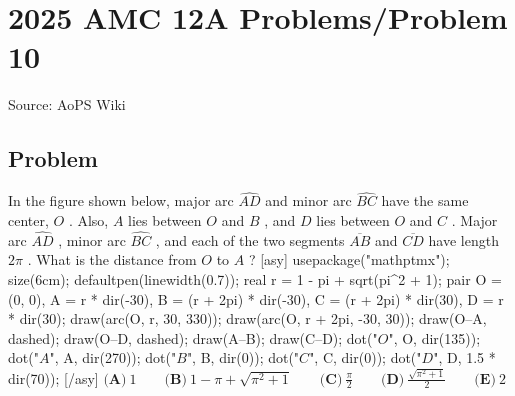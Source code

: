 \documentclass[12pt]{article}
\begin{document}
\section*{{2025 AMC 12A Problems/Problem 10}}
Source: AoPS Wiki

\subsection*{Problem}
In the figure shown below, major arc $\widehat{AD}$ and minor arc $\widehat{BC}$ have the same center, $O$ . Also, $A$ lies between $O$ and $B$ , and $D$ lies between $O$ and $C$ . Major arc $\widehat{AD}$ , minor arc $\widehat{BC}$ , and each of the two segments $\overline{AB}$ and $\overline{CD}$ have length $2\pi$ . What is the distance from $O$ to $A$ ? [asy] usepackage("mathptmx"); size(6cm); defaultpen(linewidth(0.7)); real r = 1 - pi + sqrt(pi^2 + 1); pair O = (0, 0), A = r * dir(-30), B = (r + 2pi) * dir(-30), C = (r + 2pi) * dir(30), D = r * dir(30); draw(arc(O, r, 30, 330)); draw(arc(O, r + 2pi, -30, 30)); draw(O--A, dashed); draw(O--D, dashed); draw(A--B); draw(C--D); dot("$O$", O, dir(135)); dot("$A$", A, dir(270)); dot("$B$", B, dir(0)); dot("$C$", C, dir(0)); dot("$D$", D, 1.5 * dir(70)); [/asy] $\textbf{(A)}~1 \qquad \textbf{(B)}~1 - \pi + \sqrt{\pi^{2} + 1} \qquad \textbf{(C)}~\frac{\pi}{2} \qquad \textbf{(D)}~\frac{\sqrt{\pi^{2} + 1}}{2} \qquad \textbf{(E)}~2$
\end{document}
